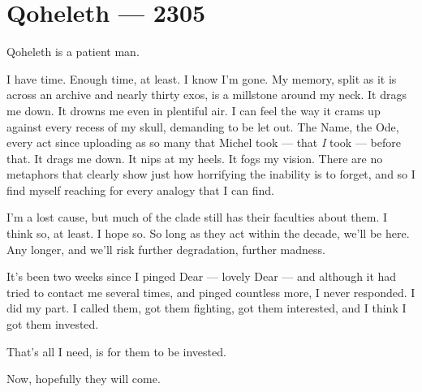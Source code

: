 \hypertarget{qoheleth-2305}{%
\chapter*{Qoheleth — 2305}\label{qoheleth-2305}}

Qoheleth is a patient man.

I have time. Enough time, at least. I know I'm gone. My memory, split as it is across an archive and nearly thirty exos, is a millstone around my neck. It drags me down. It drowns me even in plentiful air. I can feel the way it crams up against every recess of my skull, demanding to be let out. The Name, the Ode, every act since uploading as so many that Michel took — that \emph{I} took — before that. It drags me down. It nips at my heels. It fogs my vision. There are no metaphors that clearly show just how horrifying the inability is to forget, and so I find myself reaching for every analogy that I can find.

I'm a lost cause, but much of the clade still has their faculties about them. I think so, at least. I hope so. So long as they act within the decade, we'll be here. Any longer, and we'll risk further degradation, further madness.

It's been two weeks since I pinged Dear — lovely Dear — and although it had tried to contact me several times, and pinged countless more, I never responded. I did my part. I called them, got them fighting, got them interested, and I think I got them invested.

That's all I need, is for them to be invested.

Now, hopefully they will come.
